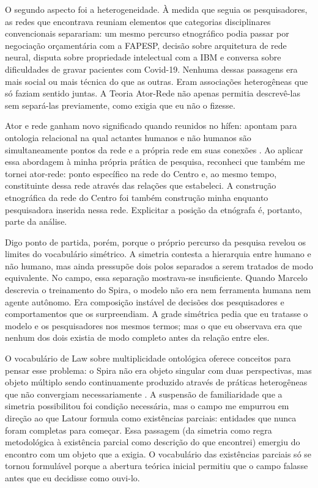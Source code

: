 O segundo aspecto foi a heterogeneidade. À medida que seguia os pesquisadores, as redes que encontrava reuniam elementos que categorias disciplinares convencionais separariam: um mesmo percurso etnográfico podia passar por negociação orçamentária com a FAPESP, decisão sobre arquitetura de rede neural, disputa sobre propriedade intelectual com a IBM e conversa sobre dificuldades de gravar pacientes com Covid-19. Nenhuma dessas passagens era mais social ou mais técnica do que as outras. Eram associações heterogêneas que só faziam sentido juntas. A Teoria Ator-Rede não apenas permitia descrevê-las sem separá-las previamente, como exigia que eu não o fizesse.

Ator e rede ganham novo significado quando reunidos no hífen: apontam para ontologia relacional na qual actantes humanos e não humanos são simultaneamente pontos da rede e a própria rede em suas conexões \parencite{Latour_SozialeWelt_1996}. Ao aplicar essa abordagem à minha própria prática de pesquisa, reconheci que também me tornei ator-rede: ponto específico na rede do Centro e, ao mesmo tempo, constituinte dessa rede através das relações que estabeleci. A construção etnográfica da rede do Centro foi também construção minha enquanto pesquisadora inserida nessa rede. Explicitar a posição da etnógrafa é, portanto, parte da análise.

Digo ponto de partida, porém, porque o próprio percurso da pesquisa revelou os limites do vocabulário simétrico. A simetria contesta a hierarquia entre humano e não humano, mas ainda pressupõe dois polos separados a serem tratados de modo equivalente. No campo, essa separação mostrava-se insuficiente. Quando Marcelo descrevia o treinamento do Spira, o modelo não era nem ferramenta humana nem agente autônomo. Era composição instável de decisões dos pesquisadores e comportamentos que os surpreendiam. A grade simétrica pedia que eu tratasse o modelo e os pesquisadores nos mesmos termos; mas o que eu observava era que nenhum dos dois existia de modo completo antes da relação entre eles.

O vocabulário de Law sobre multiplicidade ontológica oferece conceitos para pensar esse problema: o Spira não era objeto singular com duas perspectivas, mas objeto múltiplo sendo continuamente produzido através de práticas heterogêneas que não convergiam necessariamente \parencite[p. 59]{Law2004After}. A suspensão de familiaridade que a simetria possibilitou foi condição necessária, mas o campo me empurrou em direção ao que Latour formula como existências parciais: entidades que nunca foram completas para começar. Essa passagem (da simetria como regra metodológica à existência parcial como descrição do que encontrei) emergiu do encontro com um objeto que a exigia. O vocabulário das existências parciais só se tornou formulável porque a abertura teórica inicial permitiu que o campo falasse antes que eu decidisse como ouvi-lo.

